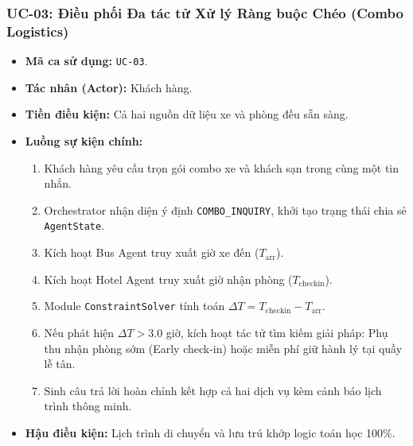\subsubsection{UC-03: Điều phối Đa tác tử Xử lý Ràng buộc Chéo (Combo Logistics)}
\begin{itemize}
    \item \textbf{Mã ca sử dụng:} \texttt{UC-03}.
    \item \textbf{Tác nhân (Actor):} Khách hàng.
    \item \textbf{Tiền điều kiện:} Cả hai nguồn dữ liệu xe và phòng đều sẵn sàng.
    \item \textbf{Luồng sự kiện chính:}
    \begin{enumerate}
        \item Khách hàng yêu cầu trọn gói combo xe và khách sạn trong cùng một tin nhắn.
        \item Orchestrator nhận diện ý định \texttt{COMBO\_INQUIRY}, khởi tạo trạng thái chia sẻ \texttt{AgentState}.
        \item Kích hoạt Bus Agent truy xuất giờ xe đến ($T_{\text{arr}}$).
        \item Kích hoạt Hotel Agent truy xuất giờ nhận phòng ($T_{\text{checkin}}$).
        \item Module \texttt{ConstraintSolver} tính toán $\Delta T = T_{\text{checkin}} - T_{\text{arr}}$.
        \item Nếu phát hiện $\Delta T > 3.0$ giờ, kích hoạt tác tử tìm kiếm giải pháp: Phụ thu nhận phòng sớm (Early check-in) hoặc miễn phí giữ hành lý tại quầy lễ tân.
        \item Sinh câu trả lời hoàn chỉnh kết hợp cả hai dịch vụ kèm cảnh báo lịch trình thông minh.
    \end{enumerate}
    \item \textbf{Hậu điều kiện:} Lịch trình di chuyển và lưu trú khớp logic toán học 100\%.
\end{itemize}

